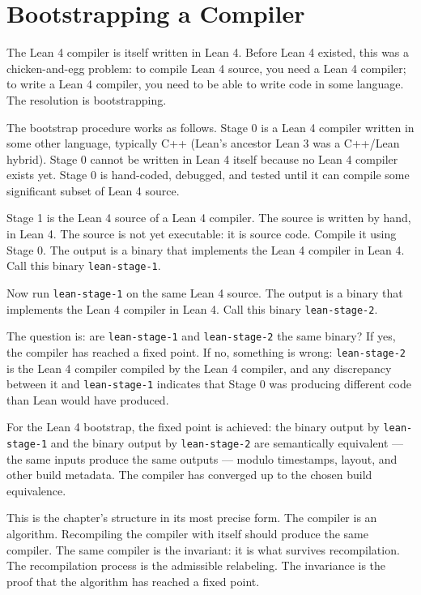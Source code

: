 \section{Bootstrapping a Compiler}
\label{se:bootstrapping-a-compiler}

The Lean 4 compiler is itself written in Lean 4. Before Lean 4 existed,
this was a chicken-and-egg problem: to compile Lean 4 source, you
need a Lean 4 compiler; to write a Lean 4 compiler, you need to be
able to write code in some language. The resolution is bootstrapping.

The bootstrap procedure works as follows. Stage 0 is a Lean 4
compiler written in some other language, typically C++ (Lean's
ancestor Lean 3 was a C++/Lean hybrid). Stage 0 cannot be written
in Lean 4 itself because no Lean 4 compiler exists yet. Stage 0
is hand-coded, debugged, and tested until it can compile some
significant subset of Lean 4 source.

Stage 1 is the Lean 4 source of a Lean 4 compiler. The source is
written by hand, in Lean 4. The source is not yet executable: it is
source code. Compile it using Stage 0. The output is a binary that
implements the Lean 4 compiler in Lean 4. Call this binary
\texttt{lean-stage-1}.

Now run \texttt{lean-stage-1} on the same Lean 4 source. The output
is a binary that implements the Lean 4 compiler in Lean 4. Call
this binary \texttt{lean-stage-2}.

The question is: are \texttt{lean-stage-1} and \texttt{lean-stage-2}
the same binary? If yes, the compiler has reached a fixed point.
If no, something is wrong: \texttt{lean-stage-2} is the Lean 4
compiler compiled by the Lean 4 compiler, and any discrepancy
between it and \texttt{lean-stage-1} indicates that Stage 0 was
producing different code than Lean would have produced.

For the Lean 4 bootstrap, the fixed point is achieved: the binary
output by \texttt{lean-stage-1} and the binary output by
\texttt{lean-stage-2} are semantically equivalent --- the same
inputs produce the same outputs --- modulo timestamps, layout,
and other build metadata. The compiler has converged up to the
chosen build equivalence.

This is the chapter's structure in its most precise form. The
compiler is an algorithm. Recompiling the compiler with itself
should produce the same compiler. The same compiler is the
invariant: it is what survives recompilation. The recompilation
process is the admissible relabeling. The invariance is the proof
that the algorithm has reached a fixed point.

